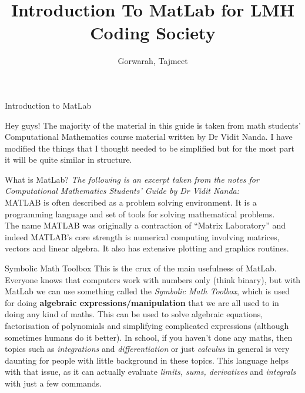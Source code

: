 \documentclass[11pt, oneside]{report}   	%
\title{Introduction To MatLab for LMH Coding Society}
\author{Gorwarah, Tajmeet}
\begin{document}
\maketitle
\begin{chapter}{Introduction to MatLab}

Hey guys! The majority of the material in this guide is taken from math students' Computational Mathematics course material written by Dr Vidit Nanda. I have modified the things that I thought needed to be simplified but for the most part it will be quite similar in structure.

\begin{section}{What is MatLab?}
\textit{The following is an excerpt taken from the notes for Computational Mathematics Students' Guide by Dr Vidit Nanda:}
\\

MATLAB is often described as a problem solving environment. It is a programming language and set of tools for solving mathematical problems.\\

The name MATLAB was originally a contraction of “Matrix Laboratory” and indeed MATLAB’s core strength is numerical computing involving matrices, vectors and linear algebra. It also has extensive plotting and graphics routines.

\begin{subsection}{Symbolic Math Toolbox}
This is the crux of the main usefulness of MatLab. Everyone knows that computers work with numbers only (think binary), but with MatLab we can use something called the
\textit{Symbolic Math Toolbox}, which is used for doing \textbf{algebraic expressions/manipulation} that we are all used to in doing any kind of maths. This can be used to
solve algebraic equations, factorisation of polynomials and simplifying complicated expressions (although sometimes humans do it better). In school, if you haven't done any
maths, then topics such as \textit{integrations} and \textit{differentiation} or just \textit{calculus} in general is very daunting for people with little background in these topics. 
This language helps with that issue, as it can actually evaluate \textit{limits, sums, derivatives} and \textit{integrals} with just a few commands.


\end{subsection}
\end{section}
\end{chapter}
\end{document}

